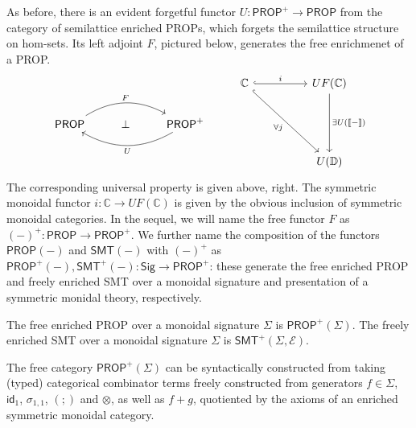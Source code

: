 As before, there is an evident forgetful functor $U: \textsf{PROP}^+ \to \textsf{PROP}$ from the category of semilattice enriched PROPs, which forgets the semilattice structure on hom-sets. Its left adjoint $F$, pictured below, generates the free enrichmenet of a PROP. 
\[\begin{tikzcd}
	&&& \mathbb{C} && {UF(\mathbb{C})} \\
	{\textsf{PROP}} & \perp & {\textsf{PROP}^+} \\
	&&&&& {U(\mathbb{D})}
	\arrow["F", bend left, from=2-1, to=2-3]
	\arrow["U", bend left, from=2-3, to=2-1]
	\arrow["i", hook, from=1-4, to=1-6]
	\arrow["{\forall j}"', hook, from=1-4, to=3-6]
	\arrow["{\exists U(\llbracket - \rrbracket)}", from=1-6, to=3-6]
\end{tikzcd}
\]
The corresponding universal property is given above, right. The symmetric monoidal functor $i: \mathbb{C} \to UF(\mathbb{C})$ is given by the obvious inclusion of symmetric monoidal categories.  In the sequel, we will name the free functor $F$ as $(-)^+: \textsf{PROP} \to \textsf{PROP}^+$.  We further name the composition of the functors $\textsf{PROP}(-)$ and $\textsf{SMT}(-)$ with $(-)^+$ as $\textsf{PROP}^+(-), \textsf{SMT}^+(-): \textsf{Sig} \to \textsf{PROP}^+$: these generate the free enriched PROP and freely enriched SMT over a monoidal signature and presentation of a symmetric monidal theory, respectively.  

\begin{definition}
The free enriched PROP over a monoidal signature $\Sigma$ is $\textsf{PROP}^+(\Sigma)$. 
The freely enriched SMT over a monoidal signature $\Sigma$ is $\textsf{SMT}^+(\Sigma, \mathcal{E})$. 
\end{definition}
The free category $\textsf{PROP}^+(\Sigma)$ can be syntactically constructed from taking (typed) categorical combinator terms freely constructed from generators $f \in \Sigma$, $\textsf{id}_1$, $\sigma_{1,1}$, $(;\!)$ and $\otimes$, as well as $f+g$, quotiented by the axioms of an enriched symmetric monoidal category.  

